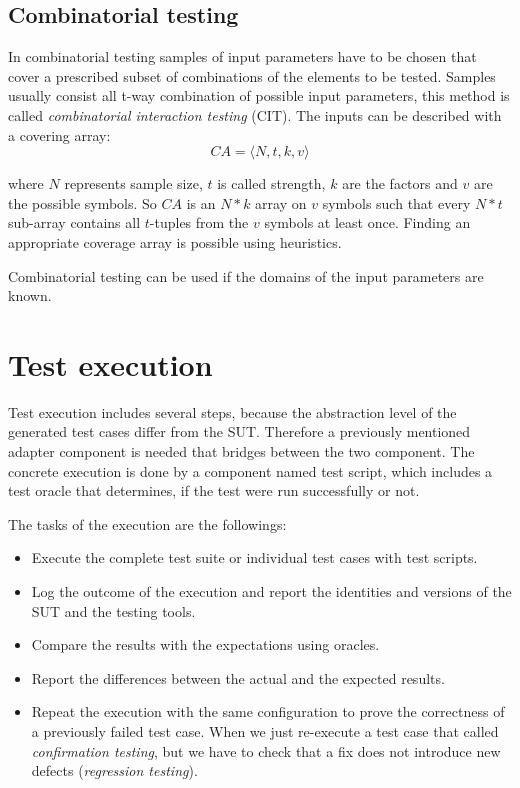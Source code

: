 
\subsection{Combinatorial testing}
\label{sub:combinatorialtesting}

In combinatorial testing samples of input parameters have to be chosen that cover a prescribed subset of combinations of the elements to be tested. Samples usually consist all t-way combination of possible input parameters, this method is called \textit{combinatorial interaction testing} (CIT). The inputs can be described with a covering array:
\begin{displaymath}
CA=\langle N, t, k, v\rangle
\end{displaymath}

where $N$ represents sample size, $t$ is called strength, $k$ are the factors and $v$ are the possible symbols. So $CA$ is an $N * k$ array on $v$ symbols such that every $N * t$ sub-array contains all $t$-tuples from the $v$ symbols at least once. Finding an appropriate coverage array is possible using heuristics.

Combinatorial testing can be used if the domains of the input parameters are known.



\section{Test execution}
\label{sec:testexecution}

Test execution includes several steps, because the abstraction level of the generated test cases differ from the SUT. Therefore a previously mentioned adapter component is needed that bridges between the two component. The concrete execution is done by a component named test script, which includes a test oracle that determines, if the test were run successfully or not.

The tasks of the execution are the followings:

\begin{itemize}
	\item Execute the complete test suite or individual test cases with test scripts.
	\item Log the outcome of the execution and report the identities and versions of the SUT and the testing tools.
	\item Compare the results with the expectations using oracles.
	\item Report the differences between the actual and the expected results.
	\item Repeat the execution with the same configuration to prove the correctness of a previously failed test case. When we just re-execute a test case that called \textit{confirmation testing}, but we have to check that a fix does not introduce new defects (\textit{regression testing}).
\end{itemize}

